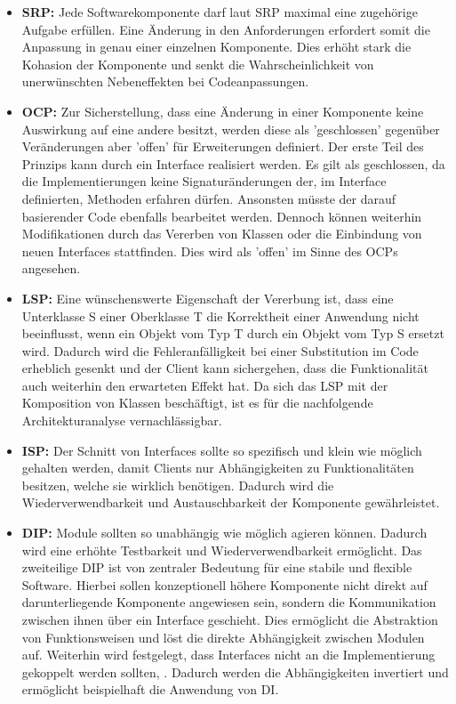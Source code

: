 \begin{itemize}[]
	\item \textbf{\acrlong{SRP}: } {Jede Softwarekomponente darf laut SRP maximal eine zugehörige Aufgabe erfüllen. Eine Änderung in den Anforderungen erfordert somit die Anpassung in genau einer einzelnen Komponente. Dies erhöht stark die \Gls{Kohasion} der Komponente und senkt die Wahrscheinlichkeit von unerwünschten Nebeneffekten bei Codeanpassungen.}
	\item \textbf{\acrlong{OCP}: } {Zur Sicherstellung, dass eine Änderung in einer Komponente keine Auswirkung auf eine andere besitzt, werden diese als 'geschlossen' gegenüber Veränderungen aber 'offen' für Erweiterungen definiert. Der erste Teil des Prinzips kann durch ein Interface realisiert werden. Es gilt als geschlossen, da die Implementierungen keine Signaturänderungen der, im Interface definierten, Methoden erfahren dürfen. Ansonsten müsste der darauf basierender Code ebenfalls bearbeitet werden. Dennoch können weiterhin Modifikationen durch das Vererben von Klassen oder die Einbindung von neuen Interfaces stattfinden. Dies wird als 'offen' im Sinne des OCPs angesehen.}
	\item \textbf{\acrlong{LSP}: } {Eine wünschenswerte Eigenschaft der Vererbung ist, dass eine Unterklasse S einer Oberklasse T die Korrektheit einer Anwendung nicht beeinflusst, wenn ein Objekt vom Typ T durch ein Objekt vom Typ S ersetzt wird. Dadurch wird die Fehleranfälligkeit bei einer Substitution im Code erheblich gesenkt und der Client kann sichergehen, dass die Funktionalität auch weiterhin den erwarteten Effekt hat. Da sich das LSP mit der Komposition von Klassen beschäftigt, ist es für die nachfolgende Architekturanalyse vernachlässigbar.}
	\item \textbf{\acrlong{ISP}: } {Der Schnitt von Interfaces sollte so spezifisch und klein wie möglich gehalten werden, damit Clients nur Abhängigkeiten zu Funktionalitäten besitzen, welche sie wirklich benötigen. Dadurch wird die Wiederverwendbarkeit und Austauschbarkeit der Komponente gewährleistet.}
	\item \textbf{\acrlong{DIP}: } {Module sollten so unabhängig wie möglich agieren können. Dadurch wird eine erhöhte Testbarkeit und Wiederverwendbarkeit ermöglicht. Das zweiteilige DIP ist von zentraler Bedeutung für eine stabile und flexible Software. Hierbei sollen konzeptionell höhere Komponente nicht direkt auf darunterliegende Komponente angewiesen sein, sondern die Kommunikation zwischen ihnen über ein Interface geschieht. Dies ermöglicht die Abstraktion von Funktionsweisen und löst die direkte Abhängigkeit zwischen Modulen auf. Weiterhin wird festgelegt, dass Interfaces nicht an die Implementierung gekoppelt werden sollten, . Dadurch werden die Abhängigkeiten invertiert und ermöglicht beispielhaft die Anwendung von \Gls{DI}.}
\end{itemize}


